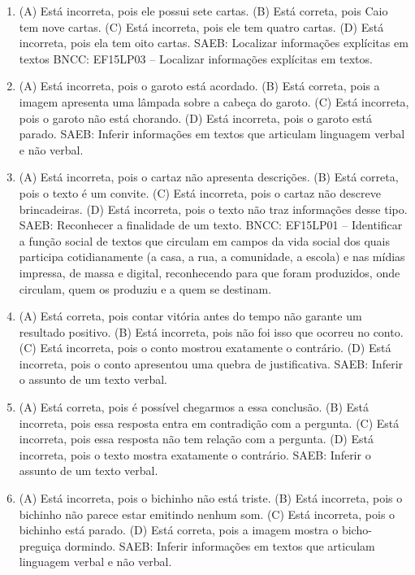 \begin{enumerate}
\item
(A) Está incorreta, pois ele possui sete cartas.
(B) Está correta, pois Caio tem nove cartas.
(C) Está incorreta, pois ele tem quatro cartas.
(D) Está incorreta, pois ela tem oito cartas.
SAEB: Localizar informações explícitas em textos
BNCC: EF15LP03 -- Localizar informações explícitas em textos.

\item
(A) Está incorreta, pois o garoto está acordado.
(B) Está correta, pois a imagem apresenta uma lâmpada sobre a cabeça do garoto.
(C) Está incorreta, pois o garoto não está chorando.
(D) Está incorreta, pois o garoto está parado.
SAEB: Inferir informações em textos que articulam linguagem verbal e não verbal.

\item
(A) Está incorreta, pois o cartaz não apresenta descrições.
(B) Está correta, pois o texto é um convite.
(C) Está incorreta, pois o cartaz não descreve brincadeiras.
(D) Está incorreta, pois o texto não traz informações desse tipo.
SAEB: Reconhecer a finalidade de um texto.
BNCC: EF15LP01 -- Identificar a função social de textos que circulam em
campos da vida social dos quais participa cotidianamente (a casa, a rua,
a comunidade, a escola) e nas mídias impressa, de massa e digital,
reconhecendo para que foram produzidos, onde circulam, quem os produziu
e a quem se destinam.

\item
(A) Está correta, pois contar vitória antes do tempo não garante um resultado positivo.
(B) Está incorreta, pois não foi isso que ocorreu no conto.
(C) Está incorreta, pois o conto mostrou exatamente o contrário.
(D) Está incorreta, pois o conto apresentou uma quebra de justificativa.
SAEB: Inferir o assunto de um texto verbal.

\item
(A) Está correta, pois é possível chegarmos a essa conclusão.
(B) Está incorreta, pois essa resposta entra em contradição com a pergunta.
(C) Está incorreta, pois essa resposta não tem relação com a pergunta.
(D) Está incorreta, pois o texto mostra exatamente o contrário.
SAEB: Inferir o assunto de um texto verbal.

\item
(A) Está incorreta, pois o bichinho não está triste.
(B) Está incorreta, pois o bichinho não parece estar emitindo nenhum som.
(C) Está incorreta, pois o bichinho está parado.
(D) Está correta, pois a imagem mostra o bicho-preguiça dormindo.
SAEB: Inferir informações em textos que articulam linguagem
verbal e não verbal.
\end{enumerate}